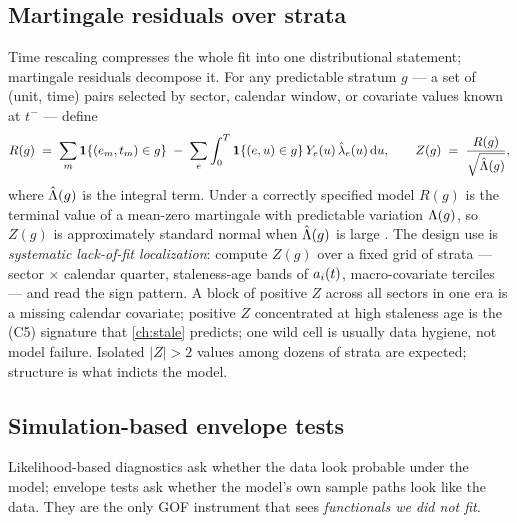 \subsection{Martingale residuals over strata}\label{ch07:sec:mres}

Time rescaling compresses the whole fit into one distributional statement;
martingale residuals decompose it. For any predictable stratum $g$ --- a
set of (unit, time) pairs selected by sector, calendar window, or
covariate values known at $t^-$ --- define
\begin{equation}\label{eq:ch07:mres}
R(g) \;=\; \sum_{m}\mathbf{1}\{(e_m,t_m)\in g\}
 \;-\; \sum_{e}\int_0^{T} \mathbf{1}\{(e,u)\in g\}\,Y_e(u)\,
 \hat{\lambda}_e(u)\,\mathrm{d} u,
\qquad
Z(g) \;=\; \frac{R(g)}{\sqrt{\hat{\Lambda}(g)}},
\end{equation}
where $\hat{\Lambda}(g)$ is the integral term. Under a correctly specified
model $R(g)$ is the terminal value of a mean-zero martingale with
predictable variation $\Lambda(g)$, so $Z(g)$ is approximately standard
normal when $\hat{\Lambda}(g)$ is large \citep{abgk1993}. The design use is
\emph{systematic lack-of-fit localization}: compute $Z(g)$ over a fixed
grid of strata --- sector $\times$ calendar quarter, staleness-age bands
of $a_i(t)$, macro-covariate terciles --- and read the sign
pattern. A block of positive $Z$ across all sectors in one era is a
missing calendar covariate; positive $Z$ concentrated at high staleness
age is the (C5) signature that \cref{ch:stale} predicts; one wild cell is
usually data hygiene, not model failure. Isolated $|Z|>2$ values among
dozens of strata are expected; structure is what indicts the model.

\subsection{Simulation-based envelope tests}\label{ch07:sec:envelope}

Likelihood-based diagnostics ask whether the data look probable under the
model; envelope tests ask whether the model's own sample paths look like
the data. They are the only GOF instrument that sees \emph{functionals we
did not fit}.

